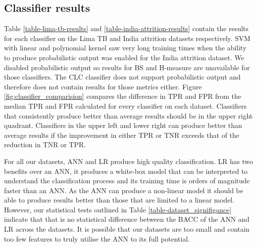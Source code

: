 \documentclass{sig-alternate-05-2015}
\begin{document}
	\subsection{Classifier results}
	\label{classifier-results}
	Table \ref{table-lima-tb-results} and \ref{table-india-attrition-results} contain the results for each classifier on the Lima TB and India attrition datasets respectively. SVM with linear and polynomial kernel saw very long training times when the ability to produce probabilistic output was enabled for the India attrition dataset. We disabled probabilistic output so results for BS and H-measure are unavailable for those classifiers. The CLC classifier does not support probabilistic output and therefore does not contain results for those metrics either. Figure \ref{fig:classifier_comparision} compares the difference in TPR and FPR from the median TPR and FPR calculated for every classifier on each dataset. Classifiers that consistently produce better than average results should be in the upper right quadrant. Classifiers in the upper left and lower right can produce better than average results if the improvement in either TPR or TNR exceeds that of the reduction in TNR or TPR. 
	
	For all our datasets, ANN and LR produce high quality classification. LR has two benefits over an ANN, it produces a white-box model that can be interpreted to understand the classification process \cite{Dreiseitl2002352} and its training time is orders of magnitude faster than an ANN. As the ANN can produce a non-linear model it should be able to produce results better than those that are limited to a linear model. However, our statistical tests outlined in Table \ref{table-dataset_signifigance} indicate that that is no statistical difference between the BACC of the ANN and LR across the datasets. It is possible that our datasets are too small and contain too few features to truly utilise the ANN to its full potential. 
	
\end{document}
